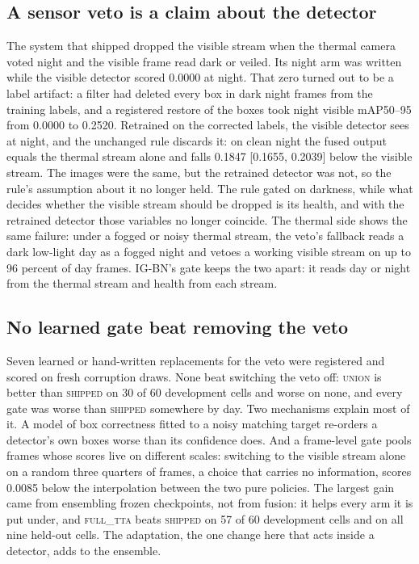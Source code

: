 \documentclass[journal]{IEEEtran}
\begin{document}
\subsection{A sensor veto is a claim about the detector}\label{sec:6.2}
The system that shipped dropped the visible stream when the thermal camera voted night and the visible frame read dark or veiled. Its night arm was written while the visible detector scored 0.0000 at night. That zero turned out to be a label artifact: a filter had deleted every box in dark night frames from the training labels, and a registered restore of the boxes took night visible mAP50--95 from 0.0000 to 0.2520. Retrained on the corrected labels, the visible detector sees at night, and the unchanged rule discards it: on clean night the fused output equals the thermal stream alone and falls 0.1847 [0.1655, 0.2039] below the visible stream. The images were the same, but the retrained detector was not, so the rule's assumption about it no longer held. The rule gated on darkness, while what decides whether the visible stream should be dropped is its health, and with the retrained detector those variables no longer coincide. The thermal side shows the same failure: under a fogged or noisy thermal stream, the veto's fallback reads a dark low-light day as a fogged night and vetoes a working visible stream on up to 96 percent of day frames. \mbox{IG-BN}'s gate keeps the two apart: it reads day or night from the thermal stream and health from each stream.

\subsection{No learned gate beat removing the veto}\label{sec:6.3}
Seven learned or hand-written replacements for the veto were registered and scored on fresh corruption draws. None beat switching the veto off: \textsc{union} is better than \textsc{shipped} on 30 of 60 development cells and worse on none, and every gate was worse than \textsc{shipped} somewhere by day. Two mechanisms explain most of it. A model of box correctness fitted to a noisy matching target re-orders a detector's own boxes worse than its confidence does. And a frame-level gate pools frames whose scores live on different scales: switching to the visible stream alone on a random three quarters of frames, a choice that carries no information, scores 0.0085 below the interpolation between the two pure policies. The largest gain came from ensembling frozen checkpoints, not from fusion: it helps every arm it is put under, and \textsc{full\_tta} beats \textsc{shipped} on 57 of 60 development cells and on all nine held-out cells. The adaptation, the one change here that acts inside a detector, adds to the ensemble.
\end{document}
